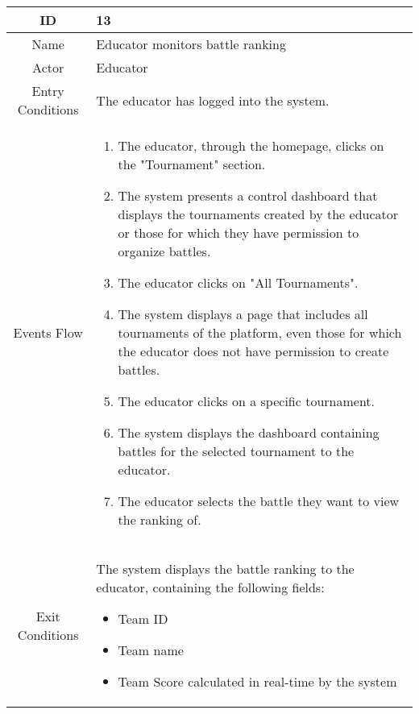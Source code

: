\begin{longtable}{|c| p{10cm}|}
    \hline
        ID & 13 \\
    \hline
        Name & Educator monitors battle ranking \\
    \hline
        Actor & Educator \\
    \hline
        Entry Conditions & 

                The educator has logged into the system.
\\
    \hline
        Events Flow &   \begin{enumerate}
                            \item The educator, through the homepage, clicks on the "Tournament" section.
                            \item The system presents a control dashboard that displays the tournaments created by the educator or those for which they have permission to organize battles.
                            \item The educator clicks on "All Tournaments".
                            \item The system displays a page that includes all tournaments of the platform, even those for which the educator does not have permission to create battles.
                            \item The educator clicks on a specific tournament.
                            \item The system displays the dashboard containing battles for the selected tournament to the educator.
                            \item The educator selects the battle they want to view the ranking of.
                        \end{enumerate} \\
    \hline
        Exit Conditions &

            The system displays the battle ranking to the educator, containing the following fields:
            \begin{itemize}
                                \item Team ID
                                \item Team name
                                \item Team Score calculated in real-time by the system
                            \end{itemize}
\\
    \hline
\end{longtable}

